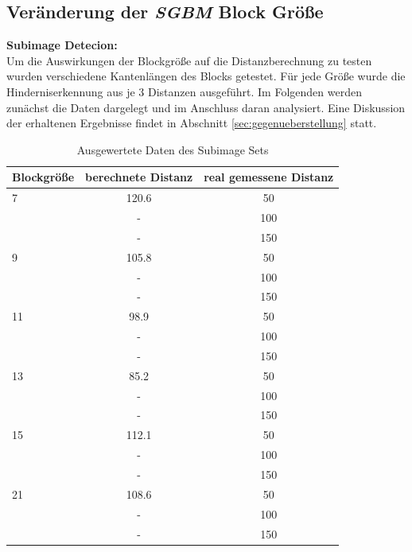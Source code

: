 \noindent
\subsection{Veränderung der \emph{SGBM} Block Größe}
\label{subsec:block_size_change}

\textbf{Subimage Detecion:}\\
\noindent
Um die Auswirkungen der Blockgröße auf die Distanzberechnung zu testen wurden verschiedene Kantenlängen des Blocks getestet. Für jede Größe wurde die Hinderniserkennung aus je 3 Distanzen ausgeführt. Im Folgenden werden zunächst die Daten dargelegt und im Anschluss daran analysiert. Eine Diskussion der erhaltenen Ergebnisse findet in Abschnitt \ref{sec:gegenueberstellung} statt.\\
	
\begin{table}[h]
\centering
\begin{tabular}{|l||c|c|}
\hline
Blockgröße & berechnete Distanz & real gemessene Distanz \\
\hline\hline
7          & 120.6          		& 50                     \\
           &  -                 & 100                    \\
           &  -                 & 150                    \\
\hline
9          & 105.8          		& 50                     \\
           &  -                 & 100                    \\
           &  -                 & 150                    \\
\hline
11         & 98.9           		& 50                     \\
           &  -                 & 100                    \\
           &  -                 & 150                    \\
\hline
13         & 85.2          		& 50                     \\
           &  -                 & 100                    \\
           &  -                 & 150                    \\
\hline
15         & 112.1		        & 50                     \\
           &  -                 & 100                    \\
           &  -                 & 150                    \\
\hline
21         & 108.6         		& 50                     \\
           &  -                 & 100                    \\
           &  -                 & 150                    \\
\hline
\end{tabular}
\caption{Ausgewertete Daten des Subimage Sets}
\label{tbl:distance_subimage}
\end{table}	

